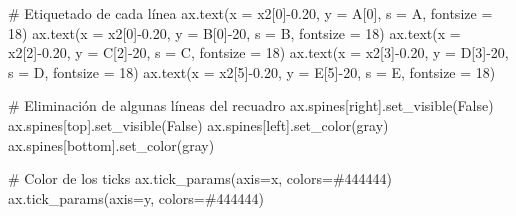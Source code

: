 \documentclass[
  letterpaper,
  DIV=11,
  numbers=noendperiod]{scrreprt}
\newenvironment{Shaded}{\begin{snugshade}}{\end{snugshade}}
\newcommand{\CommentTok}[1]{\textcolor[rgb]{0.37,0.37,0.37}{#1}}
\newcommand{\DecValTok}[1]{\textcolor[rgb]{0.68,0.00,0.00}{#1}}
\newcommand{\FloatTok}[1]{\textcolor[rgb]{0.68,0.00,0.00}{#1}}
\newcommand{\NormalTok}[1]{\textcolor[rgb]{0.00,0.23,0.31}{#1}}
\newcommand{\OperatorTok}[1]{\textcolor[rgb]{0.37,0.37,0.37}{#1}}
\newcommand{\StringTok}[1]{\textcolor[rgb]{0.13,0.47,0.30}{#1}}
\newcommand{\VariableTok}[1]{\textcolor[rgb]{0.07,0.07,0.07}{#1}}
\begin{document}
\begin{Shaded}
\begin{Highlighting}[]
\CommentTok{\# Etiquetado de cada línea}
\NormalTok{ax.text(x }\OperatorTok{=}\NormalTok{ x2[}\DecValTok{0}\NormalTok{]}\OperatorTok{{-}}\FloatTok{0.20}\NormalTok{, y }\OperatorTok{=}\NormalTok{ A[}\DecValTok{0}\NormalTok{], s }\OperatorTok{=} \StringTok{\textquotesingle{}A\textquotesingle{}}\NormalTok{, fontsize }\OperatorTok{=} \DecValTok{18}\NormalTok{)}
\NormalTok{ax.text(x }\OperatorTok{=}\NormalTok{ x2[}\DecValTok{0}\NormalTok{]}\OperatorTok{{-}}\FloatTok{0.20}\NormalTok{, y }\OperatorTok{=}\NormalTok{ B[}\DecValTok{0}\NormalTok{]}\OperatorTok{{-}}\DecValTok{20}\NormalTok{, s }\OperatorTok{=} \StringTok{\textquotesingle{}B\textquotesingle{}}\NormalTok{, fontsize }\OperatorTok{=} \DecValTok{18}\NormalTok{)}
\NormalTok{ax.text(x }\OperatorTok{=}\NormalTok{ x2[}\DecValTok{2}\NormalTok{]}\OperatorTok{{-}}\FloatTok{0.20}\NormalTok{, y }\OperatorTok{=}\NormalTok{ C[}\DecValTok{2}\NormalTok{]}\OperatorTok{{-}}\DecValTok{20}\NormalTok{, s }\OperatorTok{=} \StringTok{\textquotesingle{}C\textquotesingle{}}\NormalTok{, fontsize }\OperatorTok{=} \DecValTok{18}\NormalTok{)}
\NormalTok{ax.text(x }\OperatorTok{=}\NormalTok{ x2[}\DecValTok{3}\NormalTok{]}\OperatorTok{{-}}\FloatTok{0.20}\NormalTok{, y }\OperatorTok{=}\NormalTok{ D[}\DecValTok{3}\NormalTok{]}\OperatorTok{{-}}\DecValTok{20}\NormalTok{, s }\OperatorTok{=} \StringTok{\textquotesingle{}D\textquotesingle{}}\NormalTok{, fontsize }\OperatorTok{=} \DecValTok{18}\NormalTok{)}
\NormalTok{ax.text(x }\OperatorTok{=}\NormalTok{ x2[}\DecValTok{5}\NormalTok{]}\OperatorTok{{-}}\FloatTok{0.20}\NormalTok{, y }\OperatorTok{=}\NormalTok{ E[}\DecValTok{5}\NormalTok{]}\OperatorTok{{-}}\DecValTok{20}\NormalTok{, s }\OperatorTok{=} \StringTok{\textquotesingle{}E\textquotesingle{}}\NormalTok{, fontsize }\OperatorTok{=} \DecValTok{18}\NormalTok{)}

\CommentTok{\# Eliminación de algunas líneas del recuadro}
\NormalTok{ax.spines[}\StringTok{\textquotesingle{}right\textquotesingle{}}\NormalTok{].set\_visible(}\VariableTok{False}\NormalTok{)}
\NormalTok{ax.spines[}\StringTok{\textquotesingle{}top\textquotesingle{}}\NormalTok{].set\_visible(}\VariableTok{False}\NormalTok{)}
\NormalTok{ax.spines[}\StringTok{\textquotesingle{}left\textquotesingle{}}\NormalTok{].set\_color(}\StringTok{\textquotesingle{}gray\textquotesingle{}}\NormalTok{)}
\NormalTok{ax.spines[}\StringTok{\textquotesingle{}bottom\textquotesingle{}}\NormalTok{].set\_color(}\StringTok{\textquotesingle{}gray\textquotesingle{}}\NormalTok{)}

\CommentTok{\# Color de los ticks}
\NormalTok{ax.tick\_params(axis}\OperatorTok{=}\StringTok{\textquotesingle{}x\textquotesingle{}}\NormalTok{, colors}\OperatorTok{=}\StringTok{\textquotesingle{}\#444444\textquotesingle{}}\NormalTok{)}
\NormalTok{ax.tick\_params(axis}\OperatorTok{=}\StringTok{\textquotesingle{}y\textquotesingle{}}\NormalTok{, colors}\OperatorTok{=}\StringTok{\textquotesingle{}\#444444\textquotesingle{}}\NormalTok{)}


\end{Highlighting}
\end{Shaded}
\end{document}
